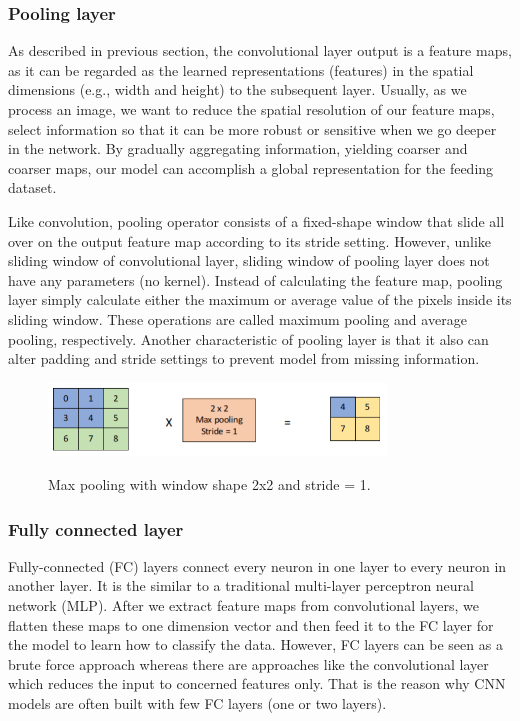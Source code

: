 \subsubsection{Pooling layer}
\noindent

	As described in previous section, the convolutional layer output is a feature maps, as it can be regarded as the learned representations (features) in the spatial dimensions (e.g., width and height) to the subsequent layer. Usually, as we process an image, we want to reduce the spatial resolution of our feature maps, select information so that it can be more robust or sensitive when we go deeper in the network.  By gradually aggregating information, yielding coarser and coarser maps, our model can accomplish a global representation for the feeding dataset.
	
	Like convolution, pooling operator consists of a fixed-shape window that slide all over on the output feature map according to its stride setting. However, unlike sliding window of convolutional layer, sliding window of pooling layer does not have any parameters (no kernel). Instead of calculating the feature map, pooling layer simply calculate either the maximum or average value of the pixels inside its sliding window. These operations are called maximum pooling and average pooling, respectively. Another characteristic of  pooling layer is that it also can alter padding and stride settings to prevent model from missing information. 	
	
	\begin{figure}[H]
		\centering
		{\includegraphics[width=0.8\textwidth]{./hinhanh/chap3/max_pooling.png}}
		\caption{Max pooling with window shape 2x2 and stride = 1.}
	\end{figure}
	
\subsubsection{Fully connected layer}
\noindent

	Fully-connected (FC) layers connect every neuron in one layer to every neuron in another layer. It is the similar to a traditional multi-layer perceptron neural network (MLP). After we extract feature maps from convolutional layers, we flatten these maps to one dimension vector and then feed it to the FC layer for the model to learn how to classify the data. However, FC layers can be seen as a brute force approach whereas there are approaches like the convolutional layer which reduces the input to concerned features only. That is the reason why CNN models are often built with few FC layers (one or two layers).	
	
